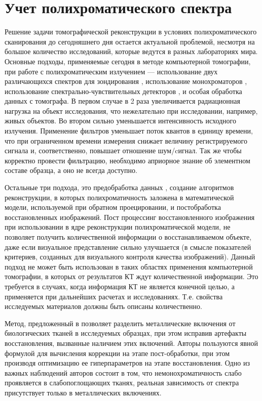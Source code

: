 \section{Учет полихроматического спектра}
Решение задачи томографической реконструкции в условиях полихроматического сканирования \cite{Herman1979bh} до сегодняшнего дня остается актуальной проблемой, несмотря на большое количество исследований, которые ведутся в разных лабораториях мира.
Основные подходы, применяемые сегодня в методе компьютерной томографии, при работе с полихроматическим излучением --- использование двух различающихся спектров для зондирования \cite{graser2009dual, marin_2014_dual_energy_ct, kuchenbecker2015dual}, использование монохроматоров \cite{tan2012beam}, использование спектрально-чувствительных детекторов \cite{sidky2018three}, и особая обработка данных с томографа. 
В первом случае в 2 раза увеличивается радиационная нагрузка на объект исследования, что нежелательно при исследовании, например, живых объектов.
Во втором сильно уменьшается интенсивность исходного излучения.
Применение фильтров уменьшает поток квантов в единицу времени, что при ограниченном времени измерения снижает величину регистрируемого сигнала и, соответственно, повышает отношение шум/cигнал. 
Так же чтобы корректно провести фильтрацию, необходимо априорное знание об элементном составе образца, а оно не всегда доступно.

Остальные три подхода, это предобработка данных \cite{dewulf2012sense}, создание алгоритмов реконструкции, в которых полихроматичность заложена в математической модели, используемой при обратном проецировании, и постобработка восстановленных изображений. 
Пост процессинг восстановленного изображения \cite{krumm2008reducing} при использовании в ядре реконструкции полихроматической модели, не позволяет получить количественной информации о восстанавливаемом объекте, даже если визуальное представление сильно улучшается (в смысле показателей критериев, созданных для визуального контроля качества изображений).
Данный подход не может быть использован в таких областях применения компьютерной томографии, в которых от результатов КТ ждут количественной информации.
Это требуется в случаях, когда информация КТ не является конечной целью, а применяется при дальнейших расчетах и исследованиях.
Т.е. свойства исследуемых материалов должны быть описаны количественно.

Метод, предложенный в \cite{park2016metal} позволяет разделить металлические включения от биологических тканей в исследуемых образцах, при этом исправив артефакты восстановления, вызванные наличием этих включений.
Авторы пользуются явной формулой для вычисления коррекции на этапе пост-обработки, при этом производя оптимизацию ее гиперпараметров на этапе восстановления.
Одно из важных наблюдений авторов состоит в том, что немонохроматичность слабо проявляется в слабопоглощающих тканях, реальная зависимость от спектра присутствует только в металлических включениях.

